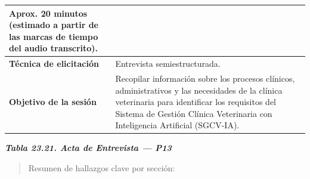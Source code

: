\documentclass[
]{article}
\begin{document}
{\begin{longtable}[]{|
  >{\raggedright\arraybackslash}p{}|
  >{\raggedright\arraybackslash}p{}|}
\begin{minipage}[t]{\linewidth}
Aprox. 20 minutos (estimado a partir de las marcas de tiempo del audio transcrito).
\end{minipage} \\
\hline
\textbf{Técnica de elicitación} & \begin{minipage}[t]{\linewidth}\raggedright
Entrevista semiestructurada.
\end{minipage} \\
\hline
\textbf{Objetivo de la sesión} & \begin{minipage}[t]{\linewidth}\raggedright
Recopilar información sobre los procesos clínicos, administrativos y las necesidades de la clínica veterinaria para identificar los requisitos del Sistema de Gestión Clínica Veterinaria con Inteligencia Artificial (SGCV-IA).
\end{minipage} \\
\hline
\end{longtable}
}

\protect{}\label{_bookmark_P13_acta}{}\emph{\textbf{Tabla 23.21. Acta de Entrevista --- P13}}

\begin{quote}
Resumen de hallazgos clave por sección:
\end{quote}
\end{document}

